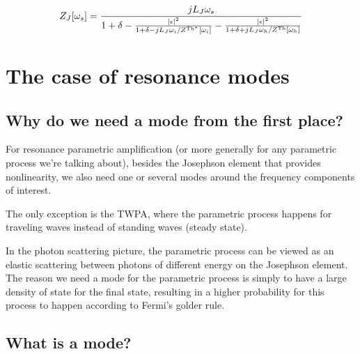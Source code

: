 \documentclass{article}
\newcommand{\Th}{\mathrm{Th}}
\begin{document}
\begin{equation}
	Z_J[\omega_s] = \frac{j L_J \omega_s }{1 + \delta - \frac{\abs{\epsilon}^2}{1 + \delta - jL_J \omega_i/Z^{\Th^*}[\omega_i]} - \frac{\abs{\epsilon}^2}{1 + \delta + jL_J \omega_h/Z^\Th[\omega_h]}}
\end{equation}






\newpage

\section{The case of resonance modes}\label{appen:mode}


\subsection{Why do we need a mode from the first place?}

For resonance parametric amplification (or more generally for any parametric process we're talking about), besides the Josephson element that provides nonlinearity, we also need one or several modes around the frequency components of interest. 

The only exception is the TWPA, where the parametric process happens for traveling waves instead of standing waves (steady state). 

In the photon scattering picture, the parametric process can be viewed as an elastic scattering between photons of different energy on the Josephson element. The reason we need a mode for the parametric process is simply to have a large density of state for the final state, resulting in a higher probability for this process to happen according to Fermi's golder rule. 



\subsection{What is a mode?}
\end{document}

